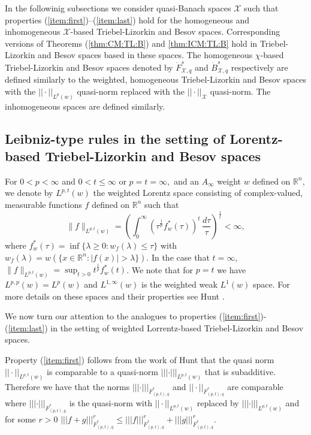 \documentclass[10pt,a4paper]{article}
\theoremstyle{remark}
\newcommand{\rn}{{{\mathbb R}^n}}
\newcommand{\tl}[3]{\dot F_{#1,#3}^{#2}} %
\newcommand{\bes}[3]{\dot B_{#1,#3}^{#2}} %
\newcommand{\lebw}[2]{L^{#1}(#2)} %
\newcommand{\abs}[1]{\left\vert #1 \right\vert}
\begin{document}
In the followinig subsections we consider quasi-Banach spaces $\mathcal{X}$ such that properties (\ref{item:first})--(\ref{item:last}) hold for the homogeneous and inhomogeneous $\mathcal{X}$-based Triebel-Lizorkin and Besov spaces. Corresponding versions of Theorems (\ref{thm:CM:TL:B}) and \ref{thm:ICM:TL:B} hold in Triebel-Lizorkin and Besov spaces based in these spaces. The homogeneous $\chi$-based Triebel-Lizorkin and Besov spaces denoted by $\tl{\mathcal{X}}{s}{q}$ and $\bes{\mathcal{X}}{s}{q}$ respectively are defined similarly to the weighted, homogeneous Triebel-Lizorkin and Besov spaces with the $||\cdot||_{L^p(w)}$ quasi-norm replaced with the $||\cdot||_\mathcal{X}$ quasi-norm. The inhomogeneous spaces are defined similarly. 

 \subsection{Leibniz-type rules in the setting of Lorentz-based Triebel-Lizorkin and Besov spaces}
 For $0<p<\infty$ and $0<t\le \infty$ or $p=t=\infty,$ and an $A_\infty$ weight $w$ defined on $\rn,$  we denote by $L^{p,t}(w)$ the weighted Lorentz space consisting of complex-valued, measurable functions $f$ defined on $\rn$ such that
\[
\|f\|_{\lebw{p,t}{w}}=\left(\int_0^\infty \left(\tau^{\frac{1}{p}} f_w^*(\tau)\right)^t\,\frac{d\tau}{\tau}\right)^{\frac{1}{t}}<\infty,
\]
where $f^*_w(\tau)=\inf\{\lambda\ge 0:w_f(\lambda)\le \tau\}$ with
$w_f(\lambda)=w(\{x\in\rn : \abs{f(x)}>\lambda\}).$ 
In the case that $t=\infty$, $\|f\|_{\lebw{p,t}{w}}= \sup_{t>0}t^{\frac{1}{p}}f_w^*(t)$. We note that for $p=t$ we have $\lebw{p,p}{w} = \lebw{p}{w}$ and $\lebw{1,\infty}{w}$ is the weighted weak $L^1(w)$ space. For more details on these spaces and their properties see Hunt \cite{MR0223874}. 

We now turn our attention to the analogues to properties (\ref{item:first})-(\ref{item:last}) in the setting of weighted Lorrentz-based Triebel-Lizorkin and Besov spaces. 

Property (\ref{item:first}) follows from the work of Hunt \cite{MR0223874} that the quasi norm $||\cdot||_{\lebw{p,t}{w}}$ is comparable to a quasi-norm $|||\cdot|||_{\lebw{p,t}{w}}$ that is subadditive. Therefore we have that the norms $|||\cdot|||_{\tl{(p,t)}{s}{q}}$ and $||\cdot||_{\tl{(p,t)}{s}{q}}$ are comparable where $|||\cdot|||_{\tl{(p,t)}{s}{q}}$ is the quasi-norm with $||\cdot||_{\lebw{p,t}{w}}$ replaced by $|||\cdot|||_{\lebw{p,t}{w}}$ and for some $r>0$ $|||f+g|||^r_{\tl{(p,t)}{s}{q}} \leq |||f|||^r_{\tl{(p,t)}{s}{q}} + |||g|||^r_{\tl{(p,t)}{s}{q}}$. 
\end{document}
